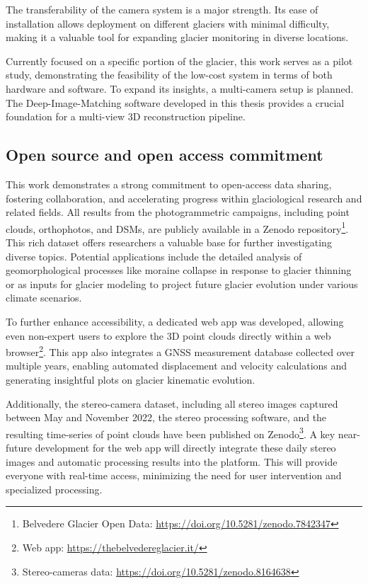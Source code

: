 The transferability of the camera system is a major strength. 
Its ease of installation allows deployment on different glaciers with minimal difficulty, making it a valuable tool for expanding glacier monitoring in diverse locations.

Currently focused on a specific portion of the glacier, this work serves as a pilot study, demonstrating the feasibility of the low-cost system in terms of both hardware and software.
To expand its insights, a multi-camera setup is planned.
The Deep-Image-Matching software developed in this thesis provides a crucial foundation for a multi-view 3D reconstruction pipeline.

\subsection*{Open source and open access commitment}

This work demonstrates a strong commitment to open-access data sharing, fostering collaboration, and accelerating progress within glaciological research and related fields.
All results from the photogrammetric campaigns, including point clouds, orthophotos, and DSMs, are publicly available in a Zenodo repository\footnote{Belvedere Glacier Open Data: \url{https://doi.org/10.5281/zenodo.7842347}}.
This rich dataset offers researchers a valuable base for further investigating diverse topics. Potential applications include the detailed analysis of geomorphological processes like moraine collapse in response to glacier thinning or as inputs for glacier modeling to project future glacier evolution under various climate scenarios.

To further enhance accessibility, a dedicated web app was developed, allowing even non-expert users to explore the 3D point clouds directly within a web browser\footnote{Web app: \url{https://thebelvedereglacier.it/}}.
This app also integrates a GNSS measurement database collected over multiple years, enabling automated displacement and velocity calculations and generating insightful plots on glacier kinematic evolution.

Additionally, the stereo-camera dataset, including all stereo images captured between May and November 2022, the stereo processing software, and the resulting time-series of point clouds have been published on Zenodo\footnote{Stereo-cameras data: \url{https://doi.org/10.5281/zenodo.8164638}}.
A key near-future development for the web app will directly integrate these daily stereo images and automatic processing results into the platform. 
This will provide everyone with real-time access, minimizing the need for user intervention and specialized processing.

